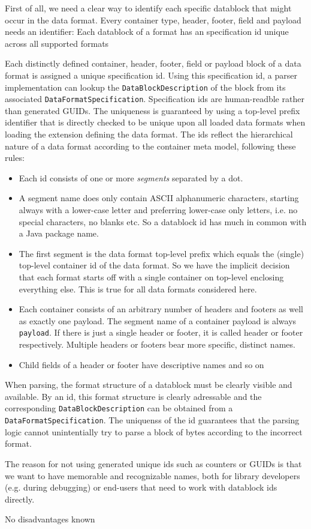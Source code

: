 First of all, we need a clear way to identify each specific datablock that might occur in the data format. Every container type, header, footer, field and payload needs an identifier:
{%
Each datablock of a format has an specification id unique across all supported formats
}
{%
Each distinctly defined container, header, footer, field or payload block of a data format is assigned a unique specification id. Using this specification id, a parser implementation can lookup the \texttt{DataBlockDescription} of the block from its associated \texttt{DataFormatSpecification}. Specification ids are human-readble rather than generated GUIDs. The uniqueness is guaranteed by using a top-level prefix identifier that is directly checked to be unique upon all loaded data formats when loading the extension defining the data format. The ids reflect the hierarchical nature of a data format according to the container meta model, following these rules:
\begin{itemize}
\item Each id consists of one or more \emph{segments} separated by a dot.
\item A segment name does only contain ASCII alphanumeric characters, starting always with a lower-case letter and preferring lower-case only letters, i.e. no special characters, no blanks etc. So a datablock id has much in common with a Java package name. 
\item The first segment is the data format top-level prefix which equals the (single) top-level container id of the data format. So we have the implicit decision that each format starts off with a single container on top-level enclosing everything else. This is true for all data formats considered here.
\item Each container consists of an arbitrary number of headers and footers as well as exactly one payload. The segment name of a container payload is always \texttt{payload}. If there is just a single header or footer, it is called header or footer respectively. Multiple headers or footers bear more specific, distinct names.
\item Child fields of a header or footer have descriptive names and so on 
\end{itemize}
}
{%
When parsing, the format structure of a datablock must be clearly visible and available. By an id, this format structure is clearly adressable and the corresponding \texttt{DataBlockDescription} can be obtained from a \texttt{DataFormatSpecification}. The uniquenss of the id guarantees that the parsing logic cannot unintentially try to parse a block of bytes according to the incorrect format.

The reason for not using generated unique ids such as counters or GUIDs is that we want to have memorable and recognizable names, both for library developers (e.g. during debugging) or \LibName{} end-users that need to work with datablock ids directly. 
}
{%
No disadvantages known
}

